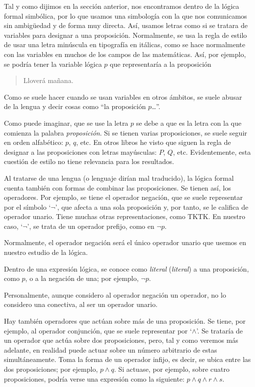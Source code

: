 Tal y como dijimos en la sección anterior, nos encontramos dentro de la
lógica formal simbólica, por lo que usamos una simbología con la que nos
comunicamos sin ambigüedad y de forma muy directa. Así, usamos letras como
si se tratara de variables para designar a una proposición. Normalmente, se
usa la regla de estilo de usar una letra minúscula en tipografía en
itálicas, como se hace normalmente con las variables en muchos de los campos
de las matemáticas. Así, por ejemplo, se podría tener la variable lógica $p$
que representaría a la proposición

\begin{quote}
  Lloverá mañana.
\end{quote}

\noindent Como se suele hacer cuando se usan variables en otros ámbitos, se
suele abusar de la lengua y decir cosas como ``la proposición $p$\ldots''.

Como puede imaginar, que se use la letra $p$ se debe a que es la letra con
la que comienza la palabra \emph{proposición}. Si se tienen varias
proposiciones, se suele seguir en orden alfabético:  $p$, $q$, etc. En otros
libros he visto que siguen la regla de designar a las proposiciones con
letras mayúsculas: $P$, $Q$, etc. Evidentemente, esta cuestión de estilo no
tiene relevancia para los resultados.

Al tratarse de una lengua (o lenguaje dirían mal traducido), la lógica
formal cuenta también con formas de combinar las proposiciones. Se tienen
así, los operadores. Por ejemplo, se tiene el operador negación, que se
suele representar por el símbolo `$\neg$', que afecta a una sola proposición
y, por tanto, se le califica de operador unario. Tiene muchas otras
representaciones, como TKTK. En nuestro caso, `$\neg$', se trata de un
operador prefijo, como en $\neg p$.


Normalmente, el operador negación será el único operador unario que usemos
en nuestro estudio de la lógica.

Dentro de una expresión lógica, se conoce como \emph{literal}
(\emph{literal}) a una proposición, como $p$, o a la negación de una; por
ejemplo, $\neg p$.

Personalmente, aunque considero al operador negación un operador, no lo
considero una conectiva, al ser un operador unario.

Hay también operadores que actúan sobre más de una proposición. Se tiene,
por ejemplo, al operador conjunción, que se suele representar por `$\land$'.
Se trataría de un operador que actúa sobre dos proposiciones, pero, tal y
como veremos más adelante, en realidad puede actuar sobre un número
arbitrario de estas simultáneamente. Toma la forma de un operador infijo, es
decir, se ubica entre las dos proposiciones; por ejemplo, $p \land q$. Si
actuase, por ejemplo, sobre cuatro proposiciones, podría verse una expresión
como la siguiente: $p \land q \land r \land s$.

